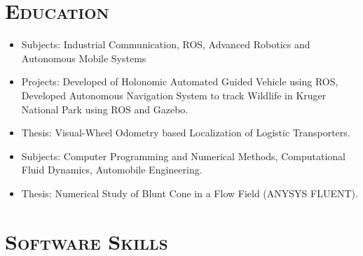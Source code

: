 \documentclass[11pt,a4paper,roman]{moderncv} %
\begin{document}

\section{\scshape{Education}}

{
\begin{itemize}
\item Subjects:  Industrial Communication, ROS, Advanced Robotics and Autonomous Mobile Systems
\item Projects: Developed of Holonomic Automated Guided Vehicle using ROS, Developed Autonomous Navigation System to track Wildlife in Kruger National Park using ROS and Gazebo.
\item Thesis: Visual-Wheel Odometry based Localization of Logistic Transporters.
\newline{}
\end{itemize}
}

{
\begin{itemize}
\item Subjects: Computer Programming and Numerical Methods, Computational Fluid Dynamics, Automobile Engineering.
\item Thesis: Numerical Study of Blunt Cone in a Flow Field (ANYSYS FLUENT).
\end{itemize}
}

\newpage

\section{\scshape{Software Skills}}

\end{document}
